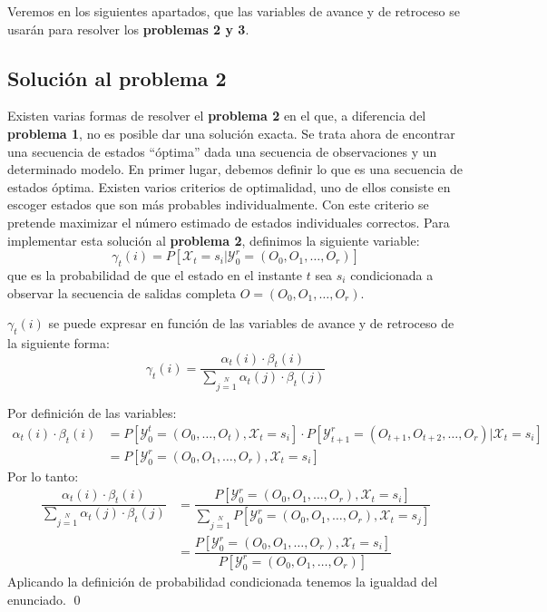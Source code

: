 Veremos en los siguientes apartados, que las variables de avance y de retroceso se usarán para resolver los \textbf{problemas 2 y 3}.

\subsection{Solución al problema 2}
Existen varias formas de resolver el \textbf{problema 2} en el que, a diferencia del \textbf{problema 1}, no es posible dar una solución exacta. Se trata ahora de encontrar una secuencia de estados \enquote{óptima} dada una secuencia de observaciones y un determinado modelo. En primer lugar, debemos definir lo que es una secuencia de estados óptima. Existen varios criterios de optimalidad, uno de ellos consiste en escoger estados que son más probables individualmente. Con este criterio se pretende maximizar el número estimado de estados individuales correctos. Para implementar esta solución al \textbf{problema 2}, definimos la siguiente variable: 
\[\gamma_t(i)=P[\mathcal{X}_t=s_i|\mathcal{Y}_0^r=(O_0,O_1,\dots, O_r)]\]
que es la probabilidad de que el estado en el instante $t$ sea $s_i$ condicionada a observar la secuencia de salidas completa $O=(O_0,O_1,\dots, O_r)$.

\begin{proposition}
$\gamma_t(i)$ se puede expresar en función de las variables de avance y de retroceso de la siguiente forma:
\[\gamma_t(i)=\dfrac{\alpha_t(i)\cdot\beta_t(i)}{\sum\limits_{j=1}\limits^N \alpha_t(j)\cdot\beta_t(j)}\]
\end{proposition}
\begin{proofs*}
Por definición de las variables:
\[
\begin{aligned}
    \alpha_t(i)\cdot\beta_t(i)&=P[\mathcal{Y}_0^t=(O_0,\dots,O_t), \mathcal{X}_t=s_i]\cdot P[\mathcal{Y}_{t+1}^r=(O_{t+1},O_{t+2},\dots,O_{r})|\mathcal{X}_t=s_i]\\
    &=P[\mathcal{Y}_0^r=(O_0,O_1,\dots, O_r),\mathcal{X}_t=s_i]
\end{aligned}
\]
Por lo tanto:
\[
\begin{aligned}
    \dfrac{\alpha_t(i)\cdot\beta_t(i)}{\sum\limits_{j=1}\limits^N \alpha_t(j)\cdot\beta_t(j)}&=\dfrac{P[\mathcal{Y}_0^r=(O_0,O_1,\dots, O_r),\mathcal{X}_t=s_i]}{\sum\limits_{j=1}\limits^N P[\mathcal{Y}_0^r=(O_0,O_1,\dots, O_r),\mathcal{X}_t=s_j]}\\
    &=\dfrac{P[\mathcal{Y}_0^r=(O_0,O_1,\dots, O_r),\mathcal{X}_t=s_i]}{P[\mathcal{Y}_0^r=(O_0,O_1,\dots, O_r)]}
\end{aligned}
\]
Aplicando la definición de probabilidad condicionada tenemos la igualdad del enunciado. \qed 
\end{proofs*}

